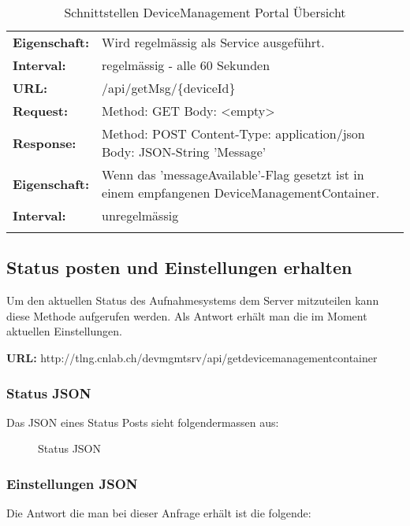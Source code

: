 {\begin{longtable}{ p{2.5cm}  p{10cm}}
	\textbf{Eigenschaft:} &  Wird regelmässig als Service ausgeführt.\\ 
	\textbf{Interval:} &  regelmässig - alle 60 Sekunden\\
\hline
\hline 
	\textbf{URL:} & /api/getMsg/\{deviceId\} \\
	\textbf{Request:} & Method: GET
		\newline Body: <empty> \\
	\textbf{Response:} & Method: POST
		\newline Content-Type: application/json
		\newline Body: JSON-String 'Message' \\
	\textbf{Eigenschaft:} &  Wenn das 'messageAvailable'-Flag gesetzt ist in einem empfangenen DeviceManagementContainer. \\
	\textbf{Interval:} & unregelmässig\\
\hline
\hline 

\caption{Schnittstellen DeviceManagement Portal Übersicht}
\end{longtable} }

\subsection{Status posten und Einstellungen erhalten}

Um den aktuellen Status des Aufnahmesystems dem Server mitzuteilen kann diese Methode aufgerufen werden. Als Antwort erhält man die im Moment aktuellen Einstellungen.

{\bf URL: }http://tlng.cnlab.ch/devmgmtsrv/api/getdevicemanagementcontainer 

\subsubsection{Status JSON}

Das JSON eines Status Posts sieht folgendermassen aus:

\begin{figure}[H]
	\centering
	
	\caption{Status JSON}
\end{figure}


\subsubsection{Einstellungen JSON}

Die Antwort die man bei dieser Anfrage erhält ist die folgende:

